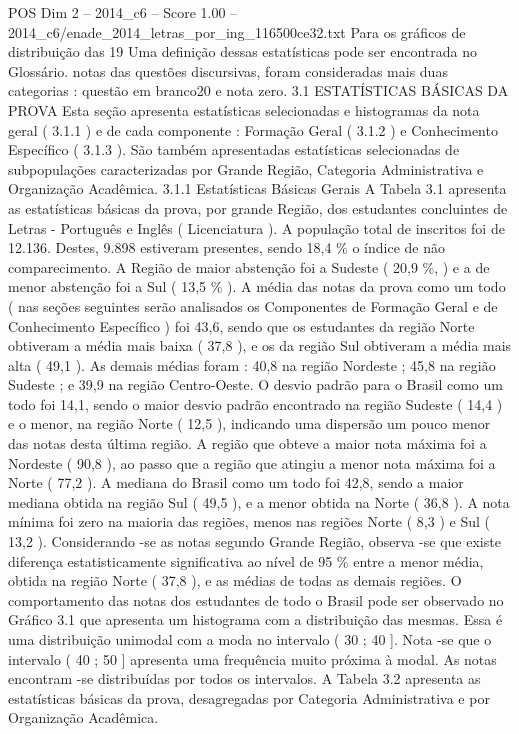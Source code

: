 \begin{textsample}{POS Dim 2 – 2014\_c6 – Score 1.00 – 2014\_c6/enade\_2014\_letras\_por\_ing\_116500ce32.txt}
Para os gráficos de distribuição das 19 Uma definição dessas estatísticas pode ser encontrada no Glossário. notas das questões discursivas, foram consideradas mais duas categorias : questão em branco20 e nota zero. 3.1 ESTATÍSTICAS BÁSICAS DA PROVA Esta seção apresenta estatísticas selecionadas e histogramas da nota geral ( 3.1.1 ) e de cada componente : Formação Geral ( 3.1.2 ) e Conhecimento Específico ( 3.1.3 ).
São também apresentadas estatísticas selecionadas de subpopulações caracterizadas por Grande Região, Categoria Administrativa e Organização Acadêmica. 3.1.1 Estatísticas Básicas Gerais A Tabela 3.1 apresenta as estatísticas básicas da prova, por grande Região, dos estudantes concluintes de Letras - Português e Inglês ( Licenciatura ).
A população total de inscritos foi de 12.136.
Destes, 9.898 estiveram presentes, sendo 18,4 \% o índice de não comparecimento.
A Região de maior abstenção foi a Sudeste ( 20,9 \%, ) e a de menor abstenção foi a Sul ( 13,5 \% ).
A média das notas da prova como um todo ( nas seções seguintes serão analisados os Componentes de Formação Geral e de Conhecimento Específico ) foi 43,6, sendo que os estudantes da região Norte obtiveram a média mais baixa ( 37,8 ), e os da região Sul obtiveram a média mais alta ( 49,1 ).
As demais médias foram : 40,8 na região Nordeste ; 45,8 na região Sudeste ; e 39,9 na região Centro-Oeste.
O desvio padrão para o Brasil como um todo foi 14,1, sendo o maior desvio padrão encontrado na região Sudeste ( 14,4 ) e o menor, na região Norte ( 12,5 ), indicando uma dispersão um pouco menor das notas desta última região.
A região que obteve a maior nota máxima foi a Nordeste ( 90,8 ), ao passo que a região que atingiu a menor nota máxima foi a Norte ( 77,2 ).
A mediana do Brasil como um todo foi 42,8, sendo a maior mediana obtida na região Sul ( 49,5 ), e a menor obtida na Norte ( 36,8 ).
A nota mínima foi zero na maioria das regiões, menos nas regiões Norte ( 8,3 ) e Sul ( 13,2 ).
Considerando -se as notas segundo Grande Região, observa -se que existe diferença estatisticamente significativa ao nível de 95 \% entre a menor média, obtida na região Norte ( 37,8 ), e as médias de todas as demais regiões.
O comportamento das notas dos estudantes de todo o Brasil pode ser observado no Gráfico 3.1 que apresenta um histograma com a distribuição das mesmas.
Essa é uma distribuição unimodal com a moda no intervalo ( 30 ; 40 ].
Nota -se que o intervalo ( 40 ; 50 ] apresenta uma frequência muito próxima à modal.
As notas encontram -se distribuídas por todos os intervalos.
A Tabela 3.2 apresenta as estatísticas básicas da prova, desagregadas por Categoria Administrativa e por Organização Acadêmica.

\end{textsample}
